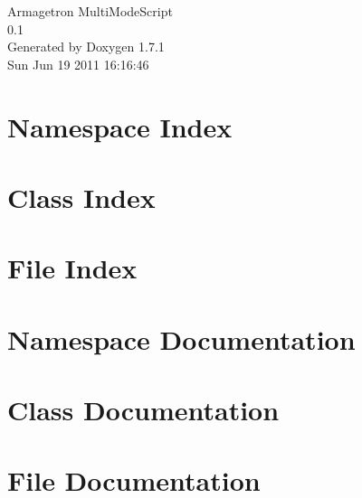 \documentclass[a4paper]{book}
\begin{document}
\hypersetup{pageanchor=false}
\begin{titlepage}
\vspace*{7cm}
\begin{center}
{\Large Armagetron MultiModeScript \\[1ex]\large 0.1 }\\
\vspace*{1cm}
{\large Generated by Doxygen 1.7.1}\\
\vspace*{0.5cm}
{\small Sun Jun 19 2011 16:16:46}\\
\end{center}
\end{titlepage}
\clearemptydoublepage
{}
\tableofcontents
\clearemptydoublepage
{}
\hypersetup{pageanchor=true}
\chapter{Namespace Index}

\chapter{Class Index}

\chapter{File Index}

\chapter{Namespace Documentation}





\chapter{Class Documentation}








\chapter{File Documentation}













\printindex
\end{document}
